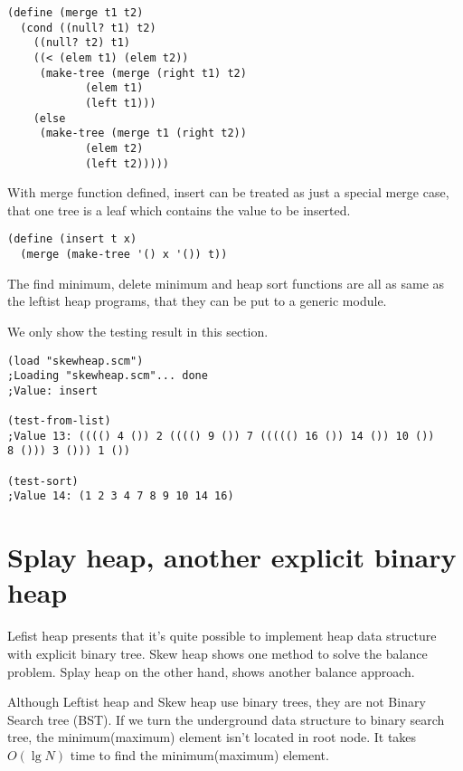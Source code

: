 \documentclass{article}
\begin{document}
\lstset{language = lisp}
\begin{lstlisting}
(define (merge t1 t2)
  (cond ((null? t1) t2)
	((null? t2) t1)
	((< (elem t1) (elem t2)) 
	 (make-tree (merge (right t1) t2) 
		    (elem t1)
		    (left t1)))
	(else 
	 (make-tree (merge t1 (right t2))
		    (elem t2)
		    (left t2)))))
\end{lstlisting}

With merge function defined, insert can be treated as just a special
merge case, that one tree is a leaf which contains the value to be
inserted.

\begin{lstlisting}
(define (insert t x)
  (merge (make-tree '() x '()) t))
\end{lstlisting}

The find minimum, delete minimum and heap sort functions are all
as same as the leftist heap programs, that they can be put to 
a generic module. 

We only show the testing result in this section.

\begin{lstlisting}
(load "skewheap.scm")
;Loading "skewheap.scm"... done
;Value: insert

(test-from-list)
;Value 13: (((() 4 ()) 2 (((() 9 ()) 7 ((((() 16 ()) 14 ()) 10 ()) 
8 ())) 3 ())) 1 ())

(test-sort)
;Value 14: (1 2 3 4 7 8 9 10 14 16)
\end{lstlisting}


\section{Splay heap, another explicit binary heap}
\label{splayheap}

Lefist heap presents that it's quite possible to implement
heap data structure with explicit binary tree. Skew heap
shows one method to solve the balance problem. Splay heap
on the other hand, shows another balance approach.

Although Leftist heap and Skew heap use binary trees, they
are not Binary Search tree (BST). If we turn the underground
data structure to binary search tree, the minimum(maximum)
element isn't located in root node. It takes $O(\lg N)$ time
to find the minimum(maximum) element.
\end{document}
